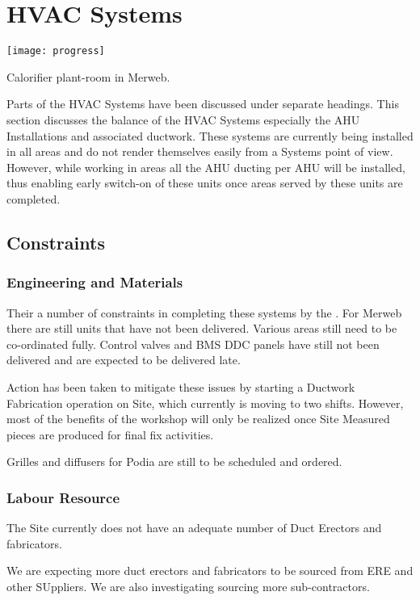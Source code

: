 \chapter{HVAC Systems}
\begin{marginfigure}
  \texttt{[image: progress]}
  \caption{Calorifier plant-room in Merweb.}
  \label{fig:progress}
\end{marginfigure}
Parts of the HVAC Systems have been discussed under separate headings. This section discusses the balance of the HVAC Systems especially the AHU Installations and associated ductwork. These systems are currently being installed in all areas and do not render themselves easily from a Systems point of view. However, while working in areas all the AHU ducting per AHU will be installed, thus enabling early switch-on of these units once areas served by these units are completed.

\section{Constraints}

\subsection{Engineering and Materials}
Their a number of constraints in completing these systems by the \deadline. For Merweb there are still units that have not been delivered. Various areas still need to be co-ordinated fully. Control valves and BMS DDC panels have still not been delivered and are expected to be delivered late.

Action has been taken to mitigate these issues by starting a Ductwork Fabrication operation on Site, which currently is moving to two shifts. However, most of the benefits of the workshop will only be realized once Site Measured pieces are produced for final fix activities.

Grilles and diffusers for Podia are still to be scheduled and ordered.

\subsection{Labour Resource}

The Site currently does not have an adequate number of Duct Erectors and fabricators. 

We are expecting more duct erectors and fabricators to be sourced from ERE and other SUppliers. We are also investigating sourcing more sub-contractors.

